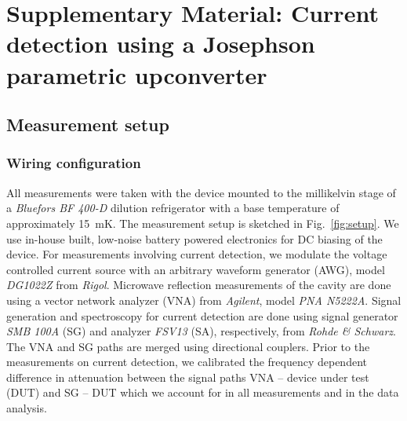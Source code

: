 
%



\clearpage
\pagebreak



\section{Supplementary Material: Current detection using a Josephson parametric upconverter}


\subsection{Measurement setup}\label{sec:measurement}

\subsubsection{Wiring configuration}

All measurements were taken with the device mounted to the millikelvin stage of a \textit{Bluefors BF 400-D} dilution refrigerator with a base temperature of approximately \SI{15}{\milli\kelvin}.
% 
The measurement setup is sketched in Fig.~\ref{fig:setup}.
% 
We use in-house built, low-noise battery powered electronics for DC biasing of the device.
% 
For measurements involving current detection, we modulate the voltage controlled current source with an arbitrary waveform generator (AWG), model \textit{DG1022Z} from \textit{Rigol}.
% 
Microwave reflection measurements of the cavity are done using a vector network analyzer (VNA) from \textit{Agilent}, model \textit{PNA N5222A}.
% 
Signal generation and spectroscopy for current detection are done using signal generator \textit{SMB 100A} (SG) and analyzer \textit{FSV13} (SA), respectively, from \textit{Rohde \& Schwarz}.
% 
The VNA and SG paths are merged using directional couplers.
% 
Prior to the measurements on current detection, we calibrated the frequency dependent difference in attenuation between the signal paths VNA -- device under test (DUT) and SG -- DUT which we account for in all measurements and in the data analysis.

